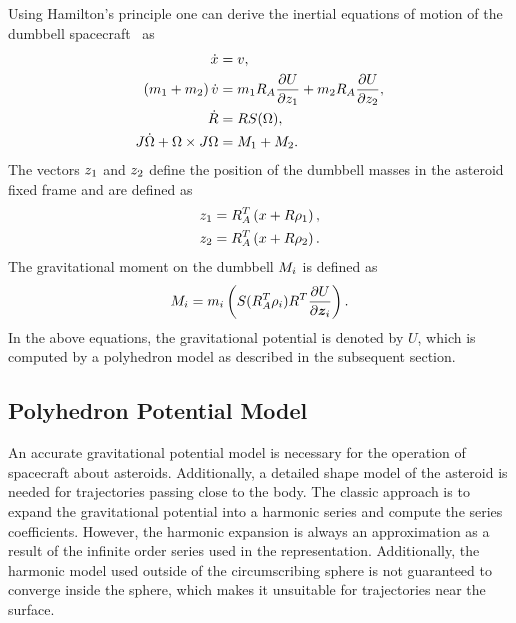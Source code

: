 \documentclass[journal]{new-aiaa}
\begin{document}
Using Hamilton's principle one can derive the inertial equations of motion of the dumbbell spacecraft~\cite{kulumani2017b} as
\begin{align}
    \dot{x} &= v, \\
    \left( m_1 + m_2 \right) \dot{v} &= m_1 R_A \frac{\partial U}{\partial z_1} + m_2 R_A \frac{\partial U}{\partial z_2},\label{eq:v_dot} \\
    \dot{R} &= R S(\Omega) , \\
    J \dot{\Omega} + \Omega \times J \Omega &= M_1 + M_2.
\end{align}
The vectors \( z_1 \) and \( z_2\) define the position of the dumbbell masses in the asteroid fixed frame and are defined as
\begin{align}
    z_1 &= R_A^T \left( x + R \rho_1 \right) , \\
    z_2 &= R_A^T \left( x + R \rho_2 \right).
\end{align}
The gravitational moment on the dumbbell \( M_i\) is defined as
\begin{align}
    M_i = m_i \left( S(R_A^T \rho_i) R^T \frac{\partial U}{\partial \bm{z}_i} \right).
\end{align}
In the above equations, the gravitational potential is denoted by $U$, which is computed by a polyhedron model as described in the subsequent section. 



\subsection{Polyhedron Potential Model}\label{sec:polyhedron_potential}

An accurate gravitational potential model is necessary for the operation of spacecraft about asteroids.
Additionally, a detailed shape model of the asteroid is needed for trajectories passing close to the body.
The classic approach is to expand the gravitational potential into a harmonic series and compute the series coefficients.
However, the harmonic expansion is always an approximation as a result of the infinite order series used in the representation.
Additionally, the harmonic model used outside of the circumscribing sphere is not guaranteed to converge inside the sphere, which makes it unsuitable for trajectories near the surface.
\end{document}

